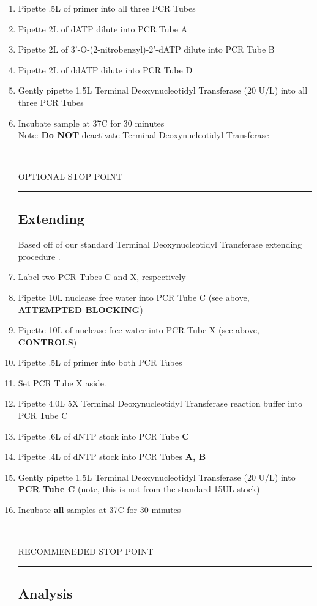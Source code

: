 \documentclass[letterpaper]{article}
\newcommand{\tdt}{Terminal Deoxynucleotidyl Transferase}
\newcommand{\C}{\degree{}C}
\newcommand{\uL}{\micro{}L}
\newcommand{\BdATP}{3'-O-(2-nitrobenzyl)-2'-dATP}
\newcommand{\stopPoint}{\begin{center}
\rule{0.5\textwidth}{.4pt}\\
\vspace{1mm} 
OPTIONAL STOP POINT\\
\rule{0.5\textwidth}{.4pt}
\end{center}}
\newcommand{\RstopPoint}{\begin{center}
\rule{0.5\textwidth}{.4pt}\\
\vspace{1mm} 
RECOMMENEDED STOP POINT\\
\rule{0.5\textwidth}{.4pt}
\end{center}}
\begin{document}
\begin{enumerate}
{\begin{enumerate}
\item{Pipette 1\uL{} of \BdATP{} stock into PCR Tube}
\item{Keep in \textbf{dark} and vortex directly before use}
\end{enumerate}
}
\item{Pipette .5\uL{} of primer into all three PCR Tubes}
\item{Pipette 2\uL{} of dATP dilute into PCR Tube A}
\item{Pipette 2\uL{} of \BdATP{} dilute into PCR Tube B}
\item{Pipette 2\uL{} of ddATP dilute into PCR Tube D}
\item{Gently pipette 1.5\uL{} \tdt{} (20 U/\uL{}) into all three PCR Tubes}
\item{Incubate sample at 37\C{} for 30 minutes}\\
Note: \textbf{Do NOT} deactivate \tdt{} 
\stopPoint{} 
\subsection{Extending}
Based off of our standard \tdt{} extending procedure \cite{genTdT}.
\item{Label two PCR Tubes C and X, respectively}
\item{Pipette 10\uL{} nuclease free water into PCR Tube C (see above, \textbf{ATTEMPTED BLOCKING})}
\item{Pipette 10\uL{} of nuclease free water into PCR Tube X (see above, \textbf{CONTROLS})}
\item{Pipette .5\uL{} of primer into both PCR Tubes}
\item{Set PCR Tube X aside.}
\item{Pipette 4.0\uL{} 5X \tdt{} reaction buffer into PCR Tube C}
\item{Pipette .6\uL{} of dNTP stock into PCR Tube \textbf{C}}
\item{Pipette .4\uL{} of dNTP stock into PCR Tubes \textbf{A, B}}
\item{Gently pipette 1.5\uL{} \tdt{} (20 U/\uL{}) into \textbf{PCR Tube C} (note, this is not from the standard 15U\uL{} stock)}
\item{Incubate \textbf{all} samples at 37\C{} for 30 minutes}\\
\RstopPoint{} 
\subsection{Analysis}




\end{enumerate}
\end{document}
